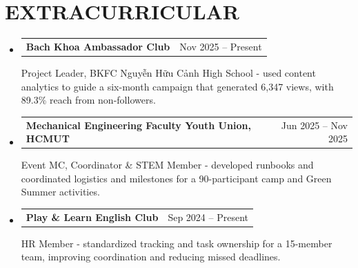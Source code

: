 \documentclass[a4paper,10pt]{article}
\makeatletter
\newcommand{\resumeActivity}[3]{
  \item
  \begin{tabularx}{0.97\textwidth}[t]{@{}>{\raggedright\arraybackslash}X@{\hspace{1em}}r@{}}
    \small\textbf{#1} & \small #2 \\
  \end{tabularx}
  \vspace{0.8pt}
  {\small\setlength{\baselineskip}{11.4pt}#3\par}
  \vspace{3.2pt}
}
\newcommand{\resumeSubHeadingListStart}{\begin{itemize}[leftmargin=0.15in,label={},itemsep=0pt,topsep=2pt,parsep=0pt,partopsep=0pt]}
\newcommand{\resumeSubHeadingListEnd}{\end{itemize}}
\makeatother
\begin{document}
\section{EXTRACURRICULAR}
\vspace{1pt}
\resumeSubHeadingListStart
  \resumeActivity
    {Bach Khoa Ambassador Club}
    {Nov 2025 -- Present}
    {Project Leader, BKFC Nguyễn Hữu Cảnh High School - used content analytics to guide a six-month campaign that generated 6,347 views, with 89.3\% reach from non-followers.}
  \resumeActivity
    {Mechanical Engineering Faculty Youth Union, HCMUT}
    {Jun 2025 -- Nov 2025}
    {Event MC, Coordinator \& STEM Member - developed runbooks and coordinated logistics and milestones for a 90-participant camp and Green Summer activities.}
  \resumeActivity
    {Play \& Learn English Club}
    {Sep 2024 -- Present}
    {HR Member - standardized tracking and task ownership for a 15-member team, improving coordination and reducing missed deadlines.}
\resumeSubHeadingListEnd
\end{document}
